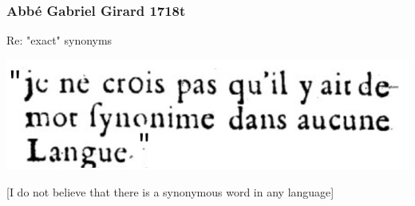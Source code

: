 \documentclass[13.5pt,aspecratio=169, xcolor=dvipsnames]{beamer}
\begin{document}
\begin{frame}
    \onehalfspacing
        \frametitle{Abbé Gabriel Girard 1718t}
        \begin{minipage}{0.6\textwidth}
            \begin{minipage}{0.5\textwidth}
                \begin{block}{}
                    Re: "exact" synonyms
                \end{block}
                
            \end{minipage}
            \vspace{1em}


            \includegraphics[width=\textwidth]{random_language.png}
            
            \vspace{1em}

            [I do not believe that there is a synonymous word in any language]


\end{minipage}
\end{frame}
\end{document}
